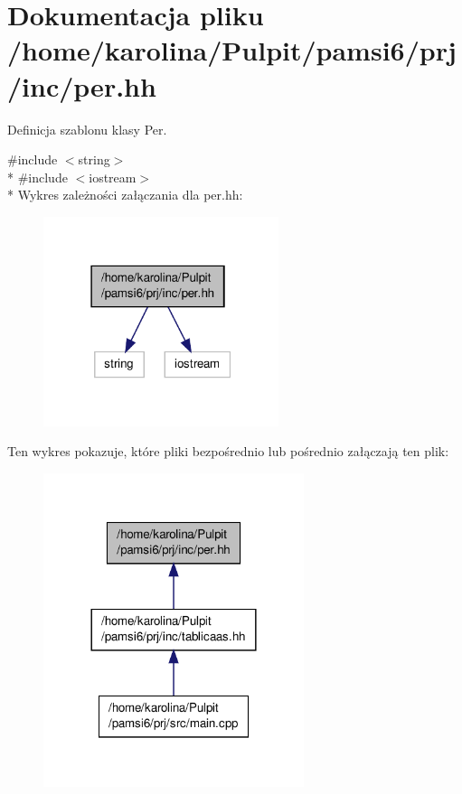 \hypertarget{per_8hh}{\section{Dokumentacja pliku /home/karolina/\-Pulpit/pamsi6/prj/inc/per.hh}
\label{per_8hh}
}


Definicja szablonu klasy Per.  


{\ttfamily \#include $<$string$>$}\\*
{\ttfamily \#include $<$iostream$>$}\\*
Wykres zależności załączania dla per.\-hh\-:\nopagebreak
\begin{figure}[H]
\begin{center}
\leavevmode
\includegraphics[width=195pt]{per_8hh__incl}
\end{center}
\end{figure}
Ten wykres pokazuje, które pliki bezpośrednio lub pośrednio załączają ten plik\-:
\nopagebreak
\begin{figure}[H]
\begin{center}
\leavevmode
\includegraphics[width=216pt]{per_8hh__dep__incl}
\end{center}
\end{figure}
